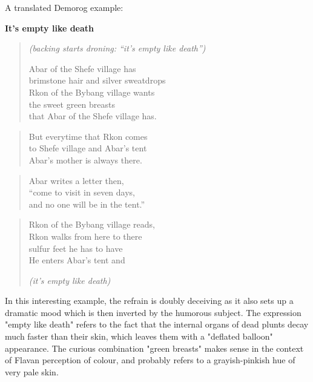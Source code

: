 \documentclass[10pt,oneside]{memoir}
\begin{document}
A translated Demorog example:


\textbf{It's empty like death}

\begin{verse}
\emph{(backing starts droning: ``it's empty like death'')}

Abar of the Shefe village has\\
brimstone hair and silver sweatdrops\\
Rkon of the Bybang village wants\\
the sweet green breasts\\
that Abar of the Shefe village has.

\end{verse}

\begin{verse}

But everytime that Rkon comes\\
to Shefe village and Abar's tent\\
Abar's mother is always there.

\end{verse}

\begin{verse}



Abar writes a letter then,\\
``come to visit in seven days,\\
and no one will be in the tent.''\\
\end{verse}

\begin{verse}


Rkon of the Bybang village reads,\\
Rkon walks from here to there\\
sulfur feet he has to have\\
He enters Abar's tent and


\emph{(it's empty like death)}

\end{verse}

In this interesting example, the refrain is doubly deceiving as it also sets up a dramatic mood which is then inverted by the humorous subject. The expression "empty like death" refers to the fact that the internal organs of dead plunts decay much faster than their skin, which leaves them with a "deflated balloon" appearance. The curious combination "green breasts" makes sense in the context of Flavan perception of colour, and probably refers to a grayish-pinkish hue of very pale skin.
\end{document}
